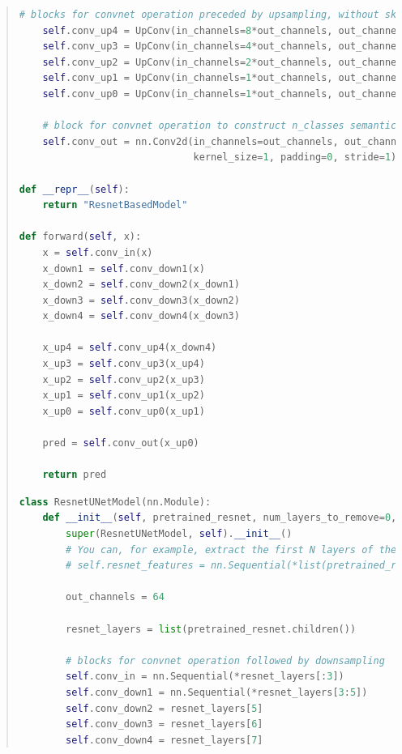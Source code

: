 \documentclass[11pt]{article}
\begin{document}
\begin{quote}
\begin{lstlisting}[language=Python, basicstyle=\scriptsize]
    # blocks for convnet operation preceded by upsampling, without skip connection
    self.conv_up4 = UpConv(in_channels=8*out_channels, out_channels=4*out_channels)
    self.conv_up3 = UpConv(in_channels=4*out_channels, out_channels=2*out_channels)
    self.conv_up2 = UpConv(in_channels=2*out_channels, out_channels=1*out_channels)
    self.conv_up1 = UpConv(in_channels=1*out_channels, out_channels=1*out_channels)
    self.conv_up0 = UpConv(in_channels=1*out_channels, out_channels=1*out_channels)

    # block for convnet operation to construct n_classes semantic outputs
    self.conv_out = nn.Conv2d(in_channels=out_channels, out_channels=n_classes, 
                              kernel_size=1, padding=0, stride=1)

def __repr__(self):
    return "ResnetBasedModel"        

def forward(self, x):
    x = self.conv_in(x)
    x_down1 = self.conv_down1(x)
    x_down2 = self.conv_down2(x_down1)
    x_down3 = self.conv_down3(x_down2)
    x_down4 = self.conv_down4(x_down3)

    x_up4 = self.conv_up4(x_down4)
    x_up3 = self.conv_up3(x_up4)
    x_up2 = self.conv_up2(x_up3)
    x_up1 = self.conv_up1(x_up2)
    x_up0 = self.conv_up0(x_up1)

    pred = self.conv_out(x_up0)

    return pred
\end{lstlisting}

\begin{lstlisting}[language=Python, basicstyle=\scriptsize]
    class ResnetUNetModel(nn.Module):
    def __init__(self, pretrained_resnet, num_layers_to_remove=0, n_classes=9):
        super(ResnetUNetModel, self).__init__()
        # You can, for example, extract the first N layers of the model like this:
        # self.resnet_features = nn.Sequential(*list(pretrained_resnet.children())[:N])
        
        out_channels = 64

        resnet_layers = list(pretrained_resnet.children())

        # blocks for convnet operation followed by downsampling
        self.conv_in = nn.Sequential(*resnet_layers[:3])              
        self.conv_down1 = nn.Sequential(*resnet_layers[3:5])          
        self.conv_down2 = resnet_layers[5]                            
        self.conv_down3 = resnet_layers[6]                            
        self.conv_down4 = resnet_layers[7]                            


\end{lstlisting}
\end{quote}
\end{document}
